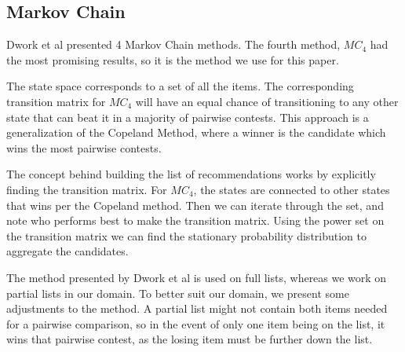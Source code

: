 \subsection{Markov Chain}\label{sec:markovchain}

Dwork et al presented 4 Markov Chain methods. The fourth method, $MC_{4}$ had the most promising results, so it is the method we use for this paper.

The state space corresponds to a set of all the items. The corresponding transition matrix for $MC_4$ will have an equal chance of transitioning to any other state that can beat it in a majority of pairwise contests. This approach is a generalization of the Copeland Method, where a winner is the candidate which wins the most pairwise contests.

The concept behind building the list of recommendations works by explicitly finding the transition matrix. For $MC_4$, the states are connected to other states that wins per the Copeland method. Then we can iterate through the set, and note who performs best to make the transition matrix. Using the power set on the transition matrix we can find the stationary probability distribution to aggregate the candidates.

The method presented by Dwork et al is used on full lists, whereas we work on partial lists in our domain. To better suit our domain, we present some adjustments to the method. A partial list might not contain both items needed for a pairwise comparison, so in the event of only one item being on the list, it wins that pairwise contest, as the losing item must be further down the list.

\cite{rank:aggregation}
